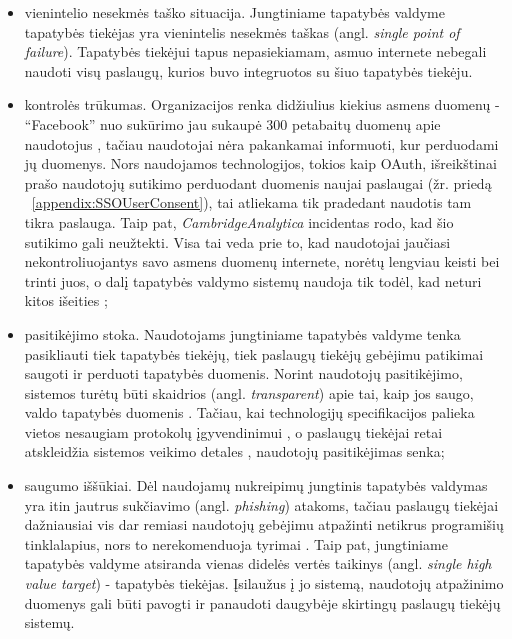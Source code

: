 \begin{itemize}
    \item vienintelio nesekmės taško situacija. Jungtiniame tapatybės valdyme tapatybės tiekėjas yra vienintelis nesekmės taškas (angl. \textit{single point of failure}).
    Tapatybės tiekėjui tapus nepasiekiamam, asmuo internete nebegali naudoti visų paslaugų, kurios buvo integruotos
    su šiuo tapatybės tiekėju.

    \item kontrolės trūkumas. Organizacijos renka didžiulius kiekius asmens duomenų - \enquote{Facebook} nuo sukūrimo
    jau sukaupė 300 petabaitų duomenų apie naudotojus \cite{Vagata2014}, tačiau naudotojai nėra pakankamai informuoti,
    kur perduodami jų duomenys. Nors naudojamos technologijos, tokios kaip OAuth, išreikštinai prašo naudotojų
    sutikimo perduodant duomenis naujai paslaugai (žr. priedą ~\ref{appendix:SSOUserConsent}), tai atliekama tik pradedant naudotis tam tikra paslauga. Taip pat,
    \textit{CambridgeAnalytica} incidentas \cite{CambridgeAnalytica} rodo, kad šio sutikimo gali neužtekti.
    Visa tai veda prie to, kad naudotojai jaučiasi nekontroliuojantys savo asmens duomenų internete, norėtų lengviau keisti bei trinti juos, o
    dalį tapatybės valdymo sistemų naudoja tik todėl, kad neturi kitos išeities \cite{Baars2016};

    \item pasitikėjimo stoka. Naudotojams jungtiniame tapatybės valdyme tenka pasikliauti tiek tapatybės tiekėjų,
    tiek paslaugų tiekėjų gebėjimu patikimai saugoti ir perduoti tapatybės duomenis. Norint naudotojų pasitikėjimo,
    sistemos turėtų būti skaidrios (angl. \textit{transparent}) apie tai, kaip jos saugo, valdo tapatybės duomenis \cite{Baars2016}.
    Tačiau, kai technologijų specifikacijos palieka vietos nesaugiam protokolų įgyvendinimui \cite{OAuthSecurity},
    o paslaugų tiekėjai retai atskleidžia sistemos veikimo detales \cite{Baars2016}, naudotojų pasitikėjimas senka;

    \item saugumo iššūkiai. Dėl naudojamų nukreipimų jungtinis tapatybės valdymas yra itin jautrus sukčiavimo (angl. \textit{phishing}) atakoms,
    tačiau paslaugų tiekėjai dažniausiai vis dar remiasi naudotojų gebėjimu atpažinti netikrus programišių tinklalapius, nors to nerekomenduoja tyrimai \cite{Sun2011}.
    Taip pat, jungtiniame tapatybės valdyme atsiranda vienas didelės vertės taikinys (angl. \textit{single high value target}) - tapatybės tiekėjas. Įsilaužus į jo sistemą,
    naudotojų atpažinimo duomenys gali būti pavogti ir panaudoti daugybėje skirtingų paslaugų tiekėjų sistemų.

\end{itemize}

